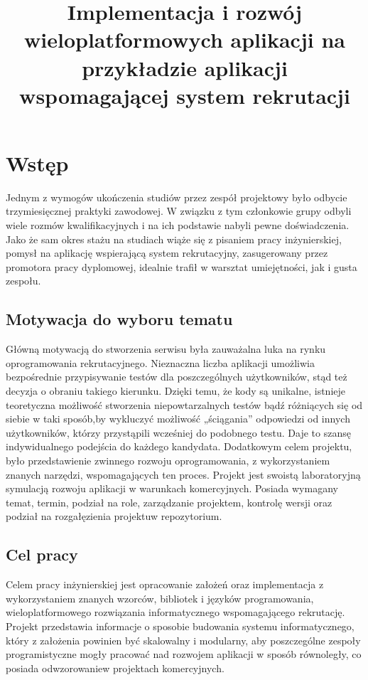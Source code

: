 \documentclass[twoside]{projektInzynierskiMS}
\title{Implementacja i rozwój wieloplatformowych aplikacji na przykładzie aplikacji wspomagającej system rekrutacji}
\numberwithin{figure}{section}
\begin{document}
\section{Wstęp}

Jednym z wymogów ukończenia studiów przez zespół projektowy było odbycie trzymiesięcznej praktyki zawodowej. W związku z tym członkowie grupy odbyli wiele rozmów kwalifikacyjnych i na ich podstawie nabyli pewne doświadczenia. Jako że sam okres stażu na studiach wiąże się z pisaniem pracy inżynierskiej, pomysł na aplikację wspierającą system rekrutacyjny, zasugerowany przez promotora pracy dyplomowej, idealnie trafił w warsztat umiejętności, jak i gusta zespołu. 

\subsection{Motywacja do wyboru tematu}
Główną motywacją do stworzenia serwisu była zauważalna luka na rynku oprogramowania rekrutacyjnego. Nieznaczna liczba aplikacji umożliwia bezpośrednie przypisywanie testów dla poszczególnych użytkowników, stąd też decyzja o obraniu takiego kierunku. Dzięki temu, że kody są unikalne, istnieje teoretyczna możliwość stworzenia niepowtarzalnych testów bądź różniących się od siebie w taki sposób,\linebreak by wykluczyć możliwość „ściągania” odpowiedzi od innych użytkowników, którzy przystąpili wcześniej do podobnego testu. Daje to szansę indywidualnego podejścia do każdego kandydata. Dodatkowym celem projektu, było przedstawienie zwinnego rozwoju oprogramowania, z wykorzystaniem znanych narzędzi, wspomagających ten proces. Projekt jest swoistą laboratoryjną symulacją rozwoju aplikacji w warunkach komercyjnych. Posiada wymagany temat, termin, podział na role, zarządzanie projektem, kontrolę wersji oraz podział na rozgałęzienia projektu\linebreak w repozytorium.

\subsection{Cel pracy}

Celem pracy inżynierskiej jest opracowanie założeń oraz implementacja z wykorzystaniem znanych wzorców, bibliotek i języków programowania, wieloplatformowego rozwiązania informatycznego wspomagającego rekrutację. Projekt przedstawia informacje o sposobie budowania systemu informatycznego, który z założenia powinien być skalowalny i modularny, aby poszczególne zespoły programistyczne mogły pracować nad rozwojem aplikacji w sposób równoległy, co posiada odwzorowanie\linebreak w projektach komercyjnych.
\end{document}
